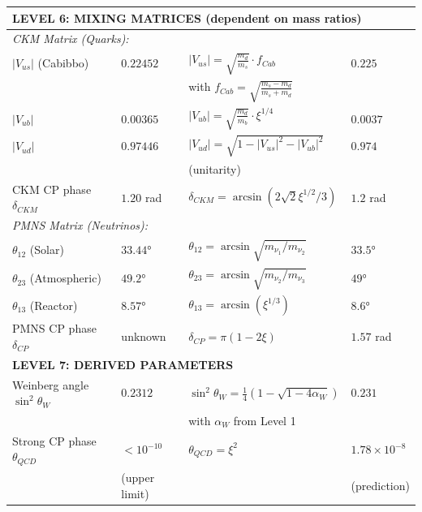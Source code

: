 \documentclass[12pt,a4paper]{report}
\begin{document}
\begin{longtable}{p{4.0cm}p{3.2cm}p{2.8cm}p{2.8cm}}
	\midrule
	\multicolumn{4}{l}{\textbf{LEVEL 6: MIXING MATRICES (dependent on mass ratios)}} \\
	\midrule
	
	\multicolumn{4}{l}{\textit{CKM Matrix (Quarks):}} \\
	
	$|V_{us}|$ (Cabibbo) & $0.22452$ & $|V_{us}| = \sqrt{\frac{m_d}{m_s}} \cdot f_{Cab}$ & $0.225$ \\
	& & with $f_{Cab} = \sqrt{\frac{m_s - m_d}{m_s + m_d}}$ & \\[0.3em]
	
	$|V_{ub}|$ & $0.00365$ & $|V_{ub}| = \sqrt{\frac{m_d}{m_b}} \cdot \xi^{1/4}$ & $0.0037$ \\
	
	$|V_{ud}|$ & $0.97446$ & $|V_{ud}| = \sqrt{1 - |V_{us}|^2 - |V_{ub}|^2}$ & $0.974$ \\
	& & (unitarity) & \\[0.3em]
	
	CKM CP phase $\delta_{CKM}$ & $1.20$ rad & $\delta_{CKM} = \arcsin(2\sqrt{2}\xi^{1/2}/3)$ & $1.2$ rad \\
	
	\multicolumn{4}{l}{\textit{PMNS Matrix (Neutrinos):}} \\
	
	$\theta_{12}$ (Solar) & $33.44°$ & $\theta_{12} = \arcsin\sqrt{m_{\nu_1}/m_{\nu_2}}$ & $33.5°$ \\
	
	$\theta_{23}$ (Atmospheric) & $49.2°$ & $\theta_{23} = \arcsin\sqrt{m_{\nu_2}/m_{\nu_3}}$ & $49°$ \\
	
	$\theta_{13}$ (Reactor) & $8.57°$ & $\theta_{13} = \arcsin(\xi^{1/3})$ & $8.6°$ \\
	
	PMNS CP phase $\delta_{CP}$ & unknown & $\delta_{CP} = \pi(1 - 2\xi)$ & $1.57$ rad \\
	
	\midrule
	\multicolumn{4}{l}{\textbf{LEVEL 7: DERIVED PARAMETERS}} \\
	\midrule
	
	Weinberg angle $\sin^2\theta_W$ & $0.2312$ & $\sin^2\theta_W = \frac{1}{4}(1-\sqrt{1-4\alpha_W})$ & $0.231$ \\
	& & with $\alpha_W$ from Level 1 & \\[0.3em]
	
	Strong CP phase $\theta_{QCD}$ & $< 10^{-10}$ & $\theta_{QCD} = \xi^{2}$ & $1.78 \times 10^{-8}$ \\
	& (upper limit) & & (prediction) \\
	
\end{longtable}
\normalsize
\end{document}
